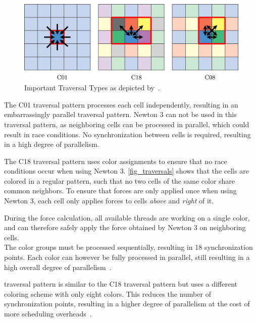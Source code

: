 \documentclass[conference]{IEEEtran}
\begin{document}
\begin{description}[style=nextline]
        \begin{figure}[H]
            \centering
            \includegraphics[width=\columnwidth]{figures/traversals.jpg}
            \caption{Important Traversal Types as depicted by~\cite{NEWCOME2023115278}.}
            \label{fig_traversals}
        \end{figure}

        \begin{description}[style=nextline, font=\itshape\mdseries]
            \item[C01]
                The C01 traversal pattern processes each cell independently, resulting in an embarrassingly parallel traversal pattern. Newton 3 can not be used in this traversal pattern, as neighboring cells can be processed in parallel, which could result in race conditions. No synchronization between cells is required, resulting in a high degree of parallelism.
            \item[C18]
                The C18 traversal pattern uses color assignments to ensure that no race conditions occur when using Newton 3. \autoref{fig_traversals} shows that the cells are colored in a regular pattern, such that no two cells of the same color share common neighbors. To ensure that forces are only applied once when using Newton 3, each cell only applies forces to cells \textit{above} and \textit{right} of it.

                During the force calculation, all available threads are working on a single color, and can therefore safely apply the force obtained by Newton 3 on neighboring cells. \\
                The color groups must be processed sequentially, resulting in 18 synchronization points. Each color can however be fully processed in parallel, still resulting in a high overall degree of parallelism~\cite{NEWCOME2023115278}.
            \item[C08]
                traversal pattern is similar to the C18 traversal pattern but uses a different coloring scheme with only eight colors. This reduces the number of synchronization points, resulting in a higher degree of parallelism at the cost of more scheduling overheads~\cite{NEWCOME2023115278}.
        \end{description}


\end{description}
\end{document}

